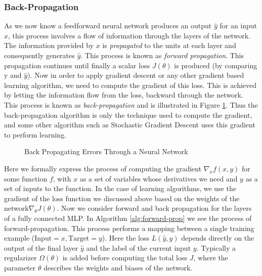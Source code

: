 \documentclass[14pt]{extarticle}
\numberwithin{equation}{section}
\begin{document}
		\subsubsection{Back-Propagation}	
		As we now know a feedforward neural network produces an output $\hat{y}$ for an input $x$, this process involves a flow of information through the layers of the network. The information provided by $x$ is \textit{propagated} to the units at each layer and consequently generates $\hat{y}$. This process is known as \textit{forward propagation}. This propagation continues until finally a scalar loss $J(\theta)$ is produced (by comparing y and $ \hat{y}$). Now in order to apply gradient descent or any other gradient based learning algorithm, we need to compute the gradient of this loss. This is achieved by letting the information flow from the loss, backward through the network. This process is known as \textit{back-propagation}\cite{rumelhart1986learning} and is illustrated in Figure \ref{back_prop}. Thus the back-propagation algorithm is only the technique used to compute the gradient, and some other algorithm such as Stochastic Gradient Descent uses this gradient to perform learning. 
		\begin{figure}[H]
			\centering
			\setlength{\fboxsep}{5pt}%
			\setlength{\fboxrule}{1pt}%
			\caption{Back Propagating Errors Through a Neural Network
				\label{back_prop}}
		\end{figure}
		Here we formally express the process of computing the gradient $\nabla_{x}f(x,y)$ for some function $f$, with $x$ as a set of variables whose derivatives we need and $y$ as a set of inputs to the function. In the case of learning algorithms, we use the gradient of the loss function we discussed above based on the weights of the network$\nabla_{\theta}J(\theta)$.
		Now we consider forward and back propagation for the layers of a fully connected MLP. In Algorithm \ref{alg:forward-prop} we see the process of forward-propagation. This process performs a mapping between a single training example ($\text{Input}=x, \text{Target}=y$). Here the loss $L(\hat{y},y)$ depends directly on the output of the final layer $\hat{y}$ and the label of the current input $y$. Typically a regularizer $\Omega(\theta)$ is added before computing the total loss $J$, where the parameter $\theta$ describes the weights and biases of the network.
\end{document}
